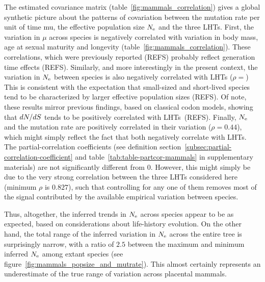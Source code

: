 The estimated covariance matrix (table~\ref{fig:mammals_correlation}) gives a global synthetic picture about the patterns of covariation between the mutation rate per unit of time mu, the effective population size $N_{\text{e}}$ and the three LHTs.
First, the variation in $\mu$ across species is negatively correlated with variation in body mass, age at sexual maturity and longevity (table~\ref{fig:mammals_correlation}).
These correlations, which were previously reported (REFS) probably reflect generation time effects (REFS).
Similarly, and more interestingly in the present context, the variation in $N_{\text{e}}$ between species is also negatively correlated with LHTs ($\rho=$)
This is consistent with the expectation that small-sized and short-lived species tend to be characterized by larger effective population sizes (REFS).
Of note, these results mirror previous findings, based on classical codon models, showing that $dN/dS$ tends to be positively correlated with LHTs~\citep{Romiguier2014,Galtier2016}(REFS).
Finally, $N_{\text{e}}$ and the mutation rate are positively correlated in their variation ($\rho = 0.44$), which might simply reflect the fact that both negatively correlate with LHTs.
The partial-correlation coefficients (see definition section~\ref{subsec:partial-correlation-coefficient} and table~\ref{tab:table-partcor-mammals} in supplementary materials) are not significantly different from 0.
However, this might simply be due to the very strong correlation between the three LHTs considered here (minimum $\rho$ is $0.827$), such that controlling for any one of them removes most of the signal contributed by the available empirical variation between species.

Thus, altogether, the inferred trends in $N_{\text{e}}$ across species appear to be as expected, based on considerations about life-history evolution.
On the other hand, the total range of the inferred variation in $N_{\text{e}}$ across the entire tree is surprisingly narrow, with a ratio of $2.5$ between the maximum and minimum inferred $N_{\text{e}}$ among extant species (see figure~\ref{fig:mammals_popsize_and_mutrate}).
This almost certainly represents an underestimate of the true range of variation across placental mammals.

